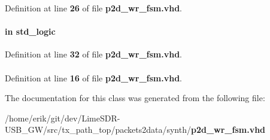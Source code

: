 Definition at line {\bf 26} of file {\bf p2d\+\_\+wr\+\_\+fsm.\+vhd}.

\paragraph[{reset\+\_\+n}]{ {\bfseries \textcolor{keywordflow}{in}\textcolor{vhdlchar}{ }} {\bfseries \textcolor{comment}{std\+\_\+logic}\textcolor{vhdlchar}{ }} \hspace{0.3cm}{\ttfamily [Port]}}\label{classp2d__wr__fsm_a446ea52ed8c4a84181a47d9165ce41a5}


Definition at line {\bf 32} of file {\bf p2d\+\_\+wr\+\_\+fsm.\+vhd}.

\paragraph[{std\+\_\+logic\+\_\+1164}]{\hspace{0.3cm}{\ttfamily [Package]}}\label{classp2d__wr__fsm_acd03516902501cd1c7296a98e22c6fcb}


Definition at line {\bf 16} of file {\bf p2d\+\_\+wr\+\_\+fsm.\+vhd}.



The documentation for this class was generated from the following file\+:\begin{DoxyCompactItemize}
\item 
/home/erik/git/dev/\+Lime\+S\+D\+R-\/\+U\+S\+B\+\_\+\+G\+W/src/tx\+\_\+path\+\_\+top/packets2data/synth/{\bf p2d\+\_\+wr\+\_\+fsm.\+vhd}\end{DoxyCompactItemize}
